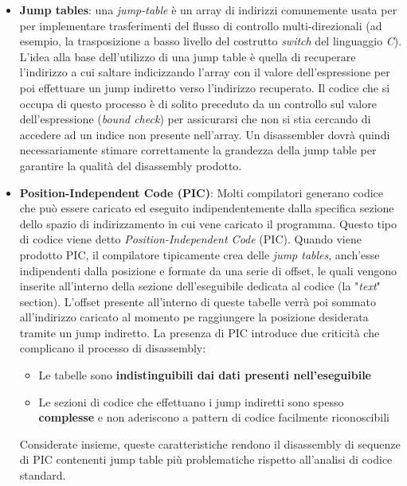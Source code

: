 \documentclass[../main.tex]{subfiles}
\begin{document}
\begin{itemize}
    \item \textbf{Jump tables}: una \textit{jump-table} è un array di indirizzi comunemente usata per per implementare trasferimenti del flusso di controllo multi-direzionali (ad esempio, la trasposizione a basso livello del costrutto \textit{switch} del linguaggio \textit{C}).
    L'idea alla base dell'utilizzo di una jump table è quella di recuperare l'indirizzo a cui saltare indicizzando l'array con il valore dell'espressione per poi effettuare un jump indiretto verso l'indirizzo recuperato.
    Il codice che si occupa di questo processo è di solito preceduto da un controllo sul valore dell'espressione (\textit{bound check}) per assicurarsi che non si stia cercando di accedere ad un indice non presente nell'array.
    Un disassembler dovrà quindi necessariamente stimare correttamente la grandezza della jump table per garantire la qualità del disassembly prodotto.
    \item \textbf{Position-Independent Code (PIC)}: Molti compilatori generano codice che può essere caricato ed eseguito indipendentemente dalla specifica sezione dello spazio di indirizzamento in cui vene caricato il programma.
    Questo tipo di codice viene detto \textit{Position-Independent Code} (PIC). Quando viene prodotto PIC, il compilatore tipicamente crea delle \textit{jump tables}, anch'esse indipendenti dalla posizione e formate da una serie di offset, le quali vengono inserite all'interno della sezione dell'eseguibile dedicata al codice (la "\textit{text}" section).
    L'offset presente all'interno di queste tabelle verrà poi sommato all'indirizzo caricato al momento pe raggiungere la posizione desiderata tramite un jump indiretto.
    La presenza di PIC introduce due criticità che complicano il processo di disassembly:
    \begin{itemize}
        \item Le tabelle sono \textbf{indistinguibili dai dati presenti nell'eseguibile}
        \item Le sezioni di codice che effettuano i jump indiretti sono spesso \textbf{complesse} e non aderiscono a pattern di codice facilmente riconoscibili
    \end{itemize}
    Considerate insieme, queste caratteristiche rendono il disassembly di sequenze di PIC contenenti jump table più problematiche rispetto all'analisi di codice standard.
\end{itemize}
\end{document}
